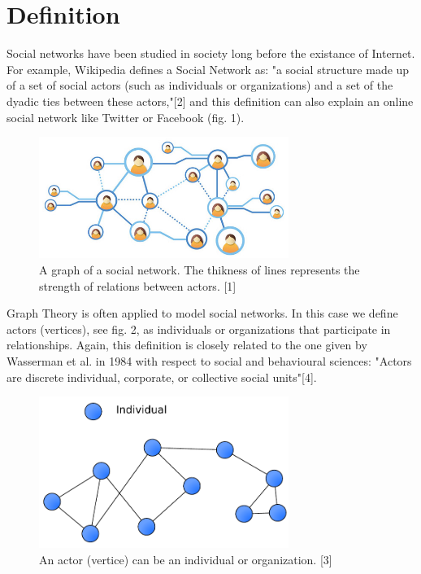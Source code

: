 \documentclass[conference,letterpaper]{IEEEtran}
\begin{document}
\section{Definition}
\indent
Social networks have been studied in society long before the existance of Internet. For example, Wikipedia defines a Social Network
as: "a social structure made up of a set of social actors (such as individuals or organizations) and a set of the dyadic ties 
between these actors,"[2] and this definition can also explain an online social network like Twitter or Facebook (fig. 1).\\
\begin{center}
\begin{figure}[H]
\centering
\includegraphics[width=3.2in]{social-network-grid}
\caption{
A graph of a social network. The thikness of lines represents the strength of relations between actors. [1]
}
\label{fig_sim1}
\end{figure}
\end{center}
Graph Theory is often applied to model social networks. In this case we define actors (vertices), see fig. 2,  
as individuals or organizations that participate in relationships. Again, this definition is closely related 
to the one given by Wasserman et al. in 1984 with respect to social and behavioural sciences: "Actors are discrete 
individual, corporate, or collective social units"[4]. \\
\begin{center}
\begin{figure}[hb]
\centering
\includegraphics[width=3.2in]{social-network}
\caption{
An actor (vertice) can be an individual or organization. [3]
}
\label{fig_sim2}
\end{figure}
\end{center}
\end{document}

